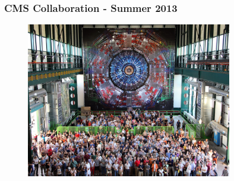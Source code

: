 \begin{frame}
\frametitle{CMS Collaboration - Summer 2013}

\begin{figure}[htbp]
\begin{center}
\includegraphics[width=0.8\textwidth]{images/cms-collaboration-2013-small.jpeg}
\end{center}
\end{figure}

\end{frame}


